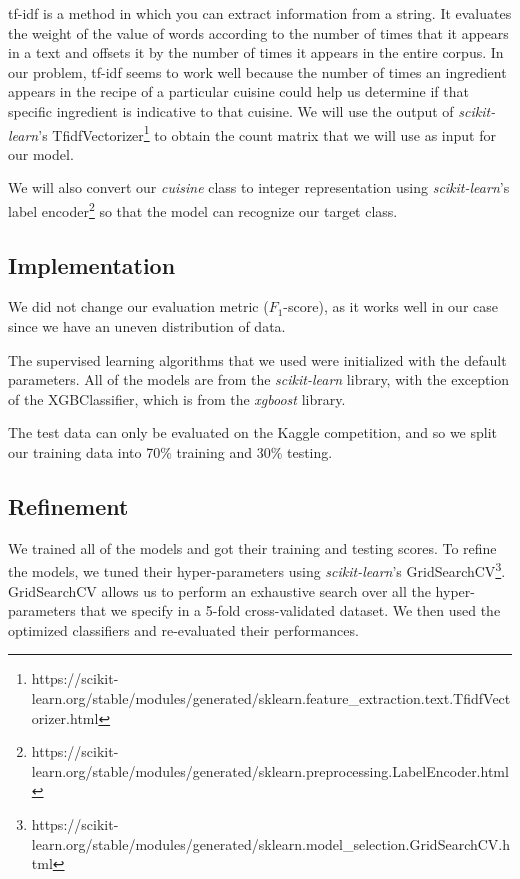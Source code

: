 \documentclass[12pt]{article}
\begin{document}
tf-idf is a method in which you can extract information from a string. It evaluates the weight of the value of words according to the number of times that it appears in a text and offsets it by the number of times it appears in the entire corpus. In our problem, tf-idf seems to work well because the number of times an ingredient appears in the recipe of a particular cuisine could help us determine if that specific ingredient is indicative to that cuisine. We will use the output of \textit{scikit-learn}'s TfidfVectorizer\footnote{https://scikit-learn.org/stable/modules/generated/sklearn.feature\_extraction.text.TfidfVectorizer.html} to obtain the count matrix that we will use as input for our model.

We will also convert our \textit{cuisine} class to integer representation using \textit{scikit-learn}'s label encoder\footnote{https://scikit-learn.org/stable/modules/generated/sklearn.preprocessing.LabelEncoder.html} so that the model can recognize our target class.

\subsection{Implementation}
We did not change our evaluation metric ($F_1$-score), as it works well in our case since we have an uneven distribution of data.

The supervised learning algorithms that we used were initialized with the default parameters. All of the models are from the \textit{scikit-learn} library, with the exception of the XGBClassifier, which is from the \textit{xgboost} library.

The test data can only be evaluated on the Kaggle competition, and so we split our training data into 70\% training and 30\% testing.

\subsection{Refinement}

We trained all of the models and got their training and testing scores. To refine the models, we tuned their hyper-parameters using \textit{scikit-learn}'s GridSearchCV\footnote{https://scikit-learn.org/stable/modules/generated/sklearn.model\_selection.GridSearchCV.html}. GridSearchCV allows us to perform an exhaustive search over all the hyper-parameters that we specify in a 5-fold cross-validated dataset. We then used the optimized classifiers and re-evaluated their performances.
\end{document}
